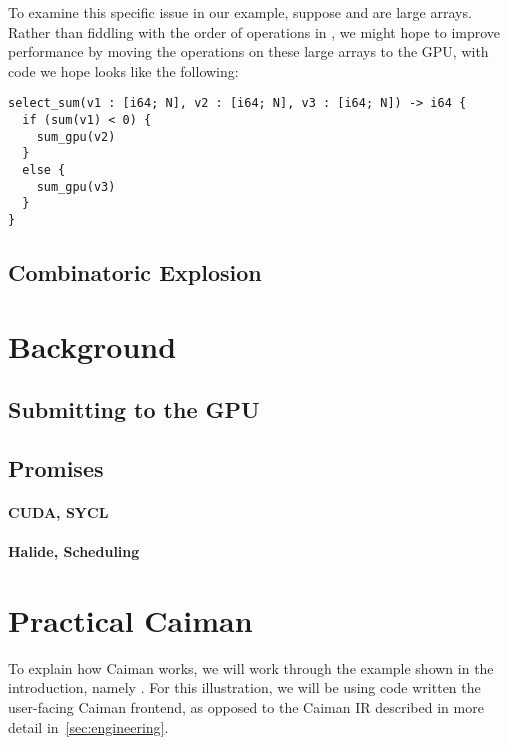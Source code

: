 To examine this specific issue in our example, suppose  and  are large arrays.  Rather than fiddling with the order of operations in , we might hope to improve performance by moving the  operations on these large arrays to the GPU, with code we hope looks like the following:
%
\begin{lstlisting}
select_sum(v1 : [i64; N], v2 : [i64; N], v3 : [i64; N]) -> i64 {
  if (sum(v1) < 0) {
    sum_gpu(v2)
  }
  else {
    sum_gpu(v3)
  }
}
\end{lstlisting}
%

\subsection{Combinatoric Explosion}
\label{subsec:combinatoric}

\section{Background}
\label{sec:background}

\subsection{Submitting to the GPU}
\label{subsec:submission}

\subsection{Promises}
\label{subsec:promise}

\paragraph{CUDA, SYCL}

\paragraph{Halide, Scheduling}

\label{subsec:linear}

\section{Practical Caiman}
\label{sec:practical}

To explain how Caiman works, we will work through the example shown in the introduction, namely .  For this illustration, we will be using code written the user-facing Caiman frontend, as opposed to the Caiman IR described in more detail in~\ref{sec:engineering}.

